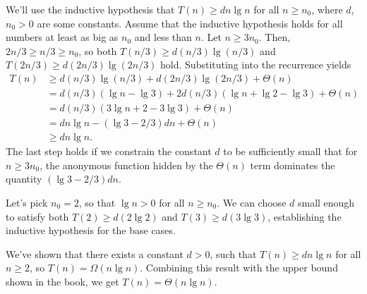 We'll use the inductive hypothesis that $T(n)\ge dn\lg n$ for all $n\ge n_0$, where $d$, $n_0>0$ are some constants.
Assume that the inductive hypothesis holds for all numbers at least as big as $n_0$ and less than $n$.
Let $n\ge3n_0$.
Then, $2n/3\ge n/3\ge n_0$, so both $T(n/3)\ge d(n/3)\lg(n/3)$ and $T(2n/3)\ge d(2n/3)\lg(2n/3)$ hold.
Substituting into the recurrence yields
\begin{align*}
    T(n) &\ge d(n/3)\lg(n/3)+d(2n/3)\lg(2n/3)+\Theta(n) \\
    &= d(n/3)(\lg n-\lg3)+2d(n/3)(\lg n+\lg2-\lg3)+\Theta(n) \\
    &= d(n/3)(3\lg n+2-3\lg3)+\Theta(n) \\
    &= dn\lg n-(\lg3-2/3)dn+\Theta(n) \\
    &\ge dn\lg n.
\end{align*}
The last step holds if we constrain the constant $d$ to be sufficiently small that for $n\ge3n_0$, the anonymous function hidden by the $\Theta(n)$ term dominates the quantity $(\lg3-2/3)dn$.

Let's pick $n_0=2$, so that $\lg n>0$ for all $n\ge n_0$.
We can choose $d$ small enough to satisfy both $T(2)\ge d(2\lg2)$ and $T(3)\ge d(3\lg3)$, establishing the inductive hypothesis for the base cases.

We've shown that there exists a constant $d>0$, such that $T(n)\ge dn\lg n$ for all $n\ge2$, so $T(n)=\Omega(n\lg n)$.
Combining this result with the upper bound shown in the book, we get $T(n)=\Theta(n\lg n)$.
